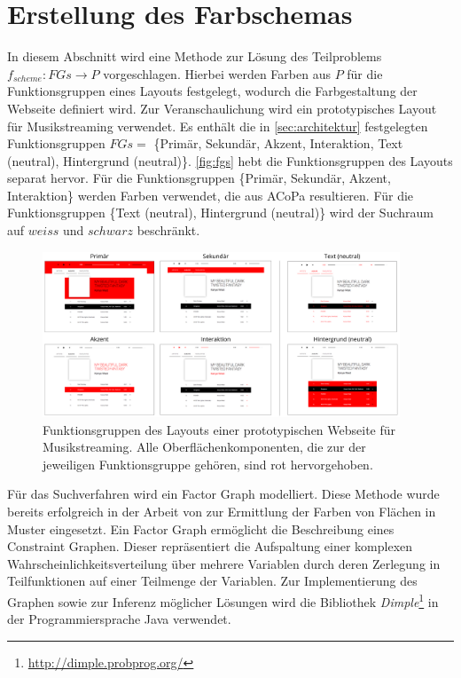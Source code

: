 \section{Erstellung des Farbschemas}
\label{sec:farbschema}

In diesem Abschnitt wird eine Methode zur Lösung des Teilproblems $f_{scheme}: FGs \to P$ vorgeschlagen. Hierbei werden Farben aus $P$ für die Funktionsgruppen eines Layouts festgelegt, wodurch die Farbgestaltung der Webseite definiert wird. Zur Veranschaulichung wird ein prototypisches Layout für Musikstreaming verwendet. Es enthält die in \autoref{sec:architektur} festgelegten Funktionsgruppen $FGs = $ \{Primär, Sekundär, Akzent, Interaktion, Text (neutral), Hintergrund (neutral)\}. \autoref{fig:fgs} hebt die Funktionsgruppen des Layouts separat hervor. Für die Funktionsgruppen \{Primär, Sekundär, Akzent, Interaktion\} werden Farben verwendet, die aus ACoPa resultieren. Für die Funktionsgruppen \{Text (neutral), Hintergrund (neutral)\} wird der Suchraum auf $weiss$ und $schwarz$ beschränkt.

\begin{figure}[]
\centering
\includegraphics[width=0.95\textwidth]{img/fgs.png}
\caption{Funktionsgruppen des Layouts einer prototypischen Webseite für Musikstreaming. Alle Oberflächenkomponenten, die zur der jeweiligen Funktionsgruppe gehören, sind rot hervorgehoben.}
\label{fig:fgs}
\end{figure}

Für das Suchverfahren wird ein Factor Graph modelliert. Diese Methode wurde bereits erfolgreich in der Arbeit von \citet{magazines} zur Ermittlung der Farben von Flächen in Muster eingesetzt. Ein Factor Graph ermöglicht die Beschreibung eines Constraint Graphen. Dieser repräsentiert die Aufspaltung einer komplexen Wahrscheinlichkeitsverteilung über mehrere Variablen durch deren Zerlegung in Teilfunktionen auf einer Teilmenge der Variablen. Zur Implementierung des Graphen sowie zur Inferenz möglicher Lösungen wird die Bibliothek \emph{Dimple}\footnote{\url{http://dimple.probprog.org/}} in der Programmiersprache Java verwendet.

